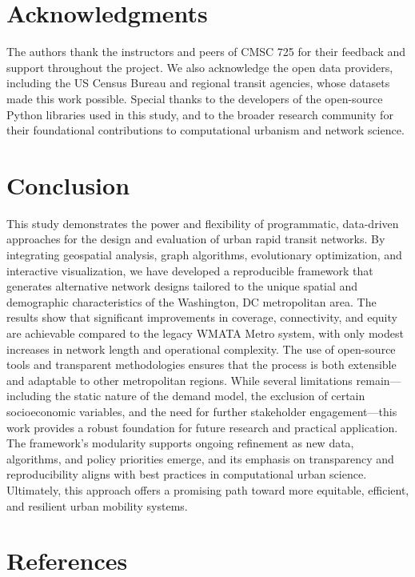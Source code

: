 \documentclass[manuscript,screen,review]{acmart}
\begin{document}
\section{Acknowledgments}

The authors thank the instructors and peers of CMSC 725 for their feedback and support throughout the project. We also acknowledge the open data providers, including the US Census Bureau and regional transit agencies, whose datasets made this work possible. Special thanks to the developers of the open-source Python libraries used in this study, and to the broader research community for their foundational contributions to computational urbanism and network science.

\section{Conclusion}

This study demonstrates the power and flexibility of programmatic, data-driven approaches for the design and evaluation of urban rapid transit networks. By integrating geospatial analysis, graph algorithms, evolutionary optimization, and interactive visualization, we have developed a reproducible framework that generates alternative network designs tailored to the unique spatial and demographic characteristics of the Washington, DC metropolitan area. The results show that significant improvements in coverage, connectivity, and equity are achievable compared to the legacy WMATA Metro system, with only modest increases in network length and operational complexity. The use of open-source tools and transparent methodologies ensures that the process is both extensible and adaptable to other metropolitan regions. While several limitations remain—including the static nature of the demand model, the exclusion of certain socioeconomic variables, and the need for further stakeholder engagement—this work provides a robust foundation for future research and practical application. The framework's modularity supports ongoing refinement as new data, algorithms, and policy priorities emerge, and its emphasis on transparency and reproducibility aligns with best practices in computational urban science. Ultimately, this approach offers a promising path toward more equitable, efficient, and resilient urban mobility systems.

\section{References}



\end{document}
